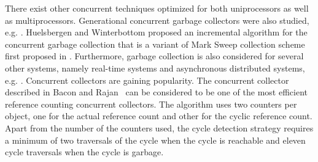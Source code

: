 There exist other concurrent techniques optimized for both uniprocessors as well as multiprocessors. Generational concurrent garbage collectors were also studied, e.g. \cite{Printezis:2000}. Huelsbergen and Winterbottom \cite{Huelsbergen1998} proposed an incremental algorithm for the concurrent garbage collection that is a variant of Mark Sweep collection scheme first proposed in \cite{McCarthy1960}.
Furthermore, garbage collection is also considered for several other systems, namely real-time systems %
and asynchronous distributed systems, e.g. \cite{Pizlo2008,Veiga2005}.
Concurrent collectors are gaining popularity. The concurrent collector described in Bacon and Rajan~\cite{Bacon2001} can be considered to be one of the most efficient reference counting concurrent collectors. The algorithm uses two counters per object, one for the actual reference count and other for the cyclic reference count. Apart from the number of the counters used, the cycle detection strategy requires a minimum of two traversals of the cycle when the cycle is reachable and eleven cycle traversals when the cycle is garbage.

